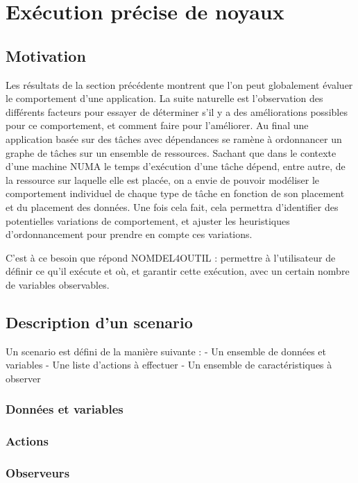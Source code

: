\section{Exécution précise de noyaux}\label{sec:contribs:outil}

\subsection{Motivation}

Les résultats de la section précédente montrent que l'on peut globalement évaluer le comportement d'une application.
La suite naturelle est l'observation des différents facteurs pour essayer de déterminer s'il y a des améliorations possibles pour ce comportement, et comment faire pour l'améliorer.
Au final une application basée sur des tâches avec dépendances se ramène à ordonnancer un graphe de tâches sur un ensemble de ressources.
Sachant que dans le contexte d'une machine NUMA le temps d'exécution d'une tâche dépend, entre autre, de la ressource sur laquelle elle est placée, on a envie de pouvoir modéliser le comportement individuel de chaque type de tâche en fonction de son placement et du placement des données.
Une fois cela fait, cela permettra d'identifier des potentielles variations de comportement, et ajuster les heuristiques d'ordonnancement pour prendre en compte ces variations.

C'est à ce besoin que répond NOMDEL4OUTIL : permettre à l'utilisateur de définir ce qu'il exécute et où, et garantir cette exécution, avec un certain nombre de variables observables.

\subsection{Description d'un scenario}

Un scenario est défini de la manière suivante :
 - Un ensemble de données et variables
 - Une liste d'actions à effectuer
 - Un ensemble de caractéristiques à observer

\subsubsection{Données et variables}
\subsubsection{Actions}
\subsubsection{Observeurs}


